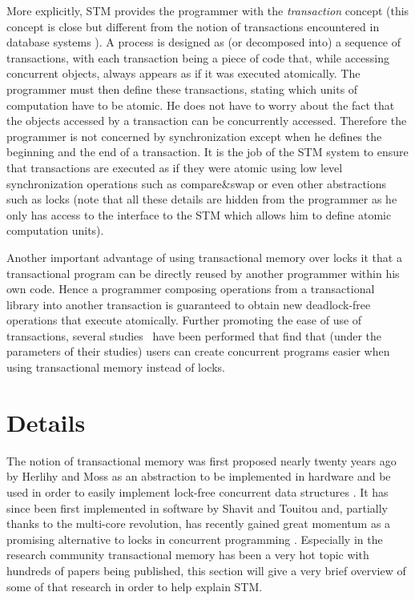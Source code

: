 More explicitly,  STM  
 provides the 
programmer  with the {\it transaction} concept (this concept 
is close but different from the notion of transactions encountered in 
database systems \cite{FFGH08,HCUAGSV07,HL08}).
 A process is designed as 
(or decomposed into)  a sequence of transactions, with each transaction 
being a piece  of code that, while  accessing  concurrent  objects, 
always  appears as if it was  executed atomically.
The programmer must then define these transactions, stating which  units of computation
have  to be atomic.  He does not have to worry about the fact that the 
objects accessed by  a transaction can be concurrently accessed. 
Therefore the programmer is not concerned by synchronization
except when he defines the beginning and the end of a  transaction.
It  is the job of the 
STM system to ensure that transactions are executed as if they were atomic using low level synchronization
operations such as compare\&swap or even other abstractions such as locks
(note that all these details are hidden from the programmer as he only has access to the interface
to the STM which allows him to define atomic computation units).

Another important advantage of using transactional memory over locks it that a transactional program
can be directly reused by another programmer within his own code.
Hence a programmer composing operations from a transactional library into another 
transaction is guaranteed to obtain new deadlock-free operations that execute atomically.
Further promoting the ease of use of transactions, several studies~\cite{PA11,RHW10}
have been performed that find that (under the parameters of their studies) users can create concurrent programs
easier when using transactional memory instead of locks.




\section{Details}
\label{sec:details}
The notion  of   transactional  memory  was
first   proposed  nearly twenty years ago by Herlihy  and Moss 
as an abstraction to be implemented in hardware and be used in order to easily 
implement lock-free concurrent  data structures  \cite{HM93}.  It  has  since  been 
first implemented in software  by Shavit  and  Touitou   \cite{ST97} and, partially thanks
to the multi-core revolution,  has
recently gained great  momentum as  a promising alternative  to locks in
concurrent programming  \cite{FFGH08,HCUAGSV07,LK08,R08}.
Especially in the research community transactional memory has been a very hot topic with hundreds
of papers being published, this section will give a very brief overview of some of that research
in order to help explain STM.


